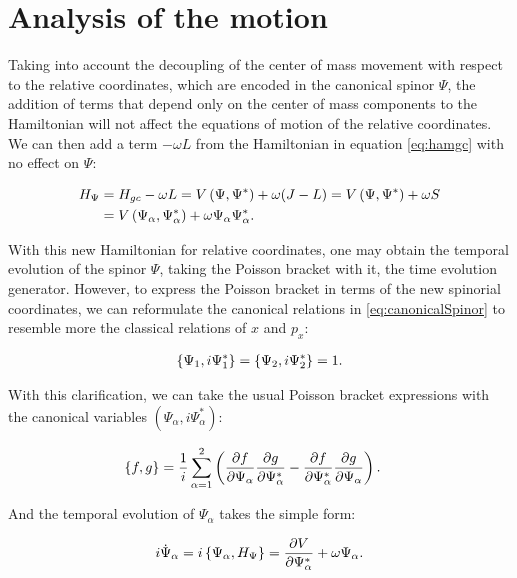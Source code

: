 \section{Analysis of the motion}
Taking into account the decoupling of the center of mass movement with respect to the relative coordinates, which are encoded in the canonical spinor $\Psi$, the addition of terms that depend only on the center of mass components to the Hamiltonian will not affect the equations of motion of the relative coordinates. We can then add a term $-\omega L$ from the Hamiltonian in equation \eqref{eq:hamgc} with no effect on $\Psi$:

\begin{align*}
H_{\Psi} &= H_{gc} - \omega L =  V\left( \Psi,\Psi^* \right)+ \omega (J-L) = V\left( \Psi,\Psi^* \right)+ \omega S\\
&= V\left( \Psi_\alpha,\Psi_\alpha^* \right)+ \omega\Psi_\alpha\Psi^*_\alpha.
\end{align*}

With this new Hamiltonian for relative coordinates, one may obtain the temporal evolution of the spinor $\Psi$, taking the Poisson bracket with it, the time evolution generator. However, to express the Poisson bracket in terms of the new spinorial coordinates, we can reformulate the canonical relations in \eqref{eq:canonicalSpinor} to resemble more the classical relations of $x$ and $p_x$:

\begin{align*}
\left\lbrace \Psi_1, i\Psi^*_1 \right\rbrace = \left\lbrace \Psi_2, i\Psi^*_2 \right\rbrace = 1.
\end{align*}

With this clarification, we can take the usual Poisson bracket expressions with the canonical variables $(\Psi_\alpha,i\Psi^*_\alpha)$:

\begin{align*}
\left\lbrace f, g \right\rbrace &= \frac{1}{i}\sum_{\alpha = 1}^2 \left( \frac{\partial f}{\partial \Psi_\alpha }\frac{\partial g}{\partial \Psi_\alpha^*}-\frac{\partial f}{\partial \Psi_\alpha^* }\frac{\partial g}{\partial \Psi_\alpha} \right).
\end{align*}

And the temporal evolution of $\Psi_\alpha$ takes the simple form:

\begin{align*}
i\dot{\Psi}_\alpha = i\left\lbrace \Psi_\alpha, H_{\Psi} \right\rbrace = \frac{\partial V}{\partial \Psi_\alpha^*} + \omega \Psi_\alpha.
\end{align*}


